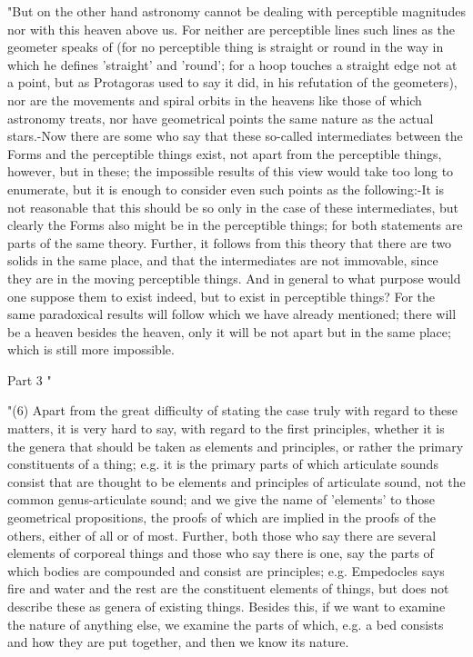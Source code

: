 "But on the other hand astronomy cannot be dealing with perceptible
magnitudes nor with this heaven above us. For neither are perceptible
lines such lines as the geometer speaks of (for no perceptible thing
is straight or round in the way in which he defines 'straight' and
'round'; for a hoop touches a straight edge not at a point, but as
Protagoras used to say it did, in his refutation of the geometers),
nor are the movements and spiral orbits in the heavens like those
of which astronomy treats, nor have geometrical points the same nature
as the actual stars.-Now there are some who say that these so-called
intermediates between the Forms and the perceptible things exist,
not apart from the perceptible things, however, but in these; the
impossible results of this view would take too long to enumerate,
but it is enough to consider even such points as the following:-It
is not reasonable that this should be so only in the case of these
intermediates, but clearly the Forms also might be in the perceptible
things; for both statements are parts of the same theory. Further,
it follows from this theory that there are two solids in the same
place, and that the intermediates are not immovable, since they are
in the moving perceptible things. And in general to what purpose would
one suppose them to exist indeed, but to exist in perceptible things?
For the same paradoxical results will follow which we have already
mentioned; there will be a heaven besides the heaven, only it will
be not apart but in the same place; which is still more impossible.

Part 3 "

"(6) Apart from the great difficulty of stating the case truly with
regard to these matters, it is very hard to say, with regard to the
first principles, whether it is the genera that should be taken as
elements and principles, or rather the primary constituents of a thing;
e.g. it is the primary parts of which articulate sounds consist that
are thought to be elements and principles of articulate sound, not
the common genus-articulate sound; and we give the name of 'elements'
to those geometrical propositions, the proofs of which are implied
in the proofs of the others, either of all or of most. Further, both
those who say there are several elements of corporeal things and those
who say there is one, say the parts of which bodies are compounded
and consist are principles; e.g. Empedocles says fire and water and
the rest are the constituent elements of things, but does not describe
these as genera of existing things. Besides this, if we want to examine
the nature of anything else, we examine the parts of which, e.g. a
bed consists and how they are put together, and then we know its nature.

